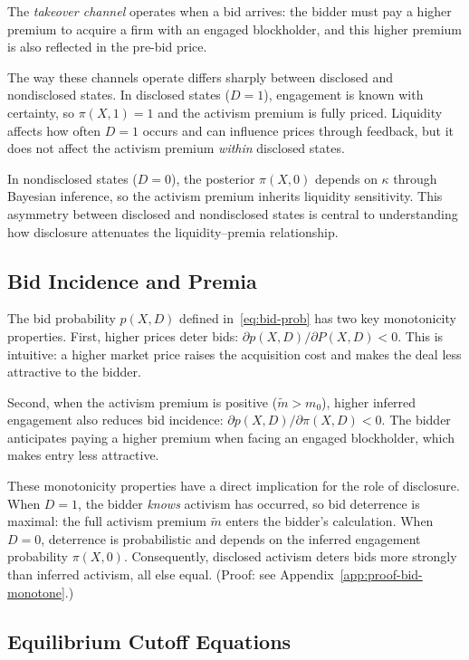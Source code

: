 \documentclass[11pt]{article}
\newcommand{\1}{\mathbf{1}}
\begin{document}
The \emph{takeover channel} operates when a bid arrives: the bidder must pay a higher premium to acquire a firm with an engaged blockholder, and this higher premium is also reflected in the pre-bid price.

The way these channels operate differs sharply between disclosed and nondisclosed states. In disclosed states ($D=1$), engagement is known with certainty, so $\pi(X,1)=1$ and the activism premium is fully priced. Liquidity affects how often $D=1$ occurs and can influence prices through feedback, but it does not affect the activism premium \emph{within} disclosed states.

In nondisclosed states ($D=0$), the posterior $\pi(X,0)$ depends on $\kappa$ through Bayesian inference, so the activism premium inherits liquidity sensitivity. This asymmetry between disclosed and nondisclosed states is central to understanding how disclosure attenuates the liquidity--premia relationship.

%
\subsection{Bid Incidence and Premia}
%

The bid probability $p(X,D)$ defined in~\eqref{eq:bid-prob} has two key monotonicity properties. First, higher prices deter bids: $\partial p(X,D)/\partial P(X,D)<0$. This is intuitive: a higher market price raises the acquisition cost and makes the deal less attractive to the bidder.

Second, when the activism premium is positive ($\tilde{m}>m_0$), higher inferred engagement also reduces bid incidence: $\partial p(X,D)/\partial\pi(X,D)<0$. The bidder anticipates paying a higher premium when facing an engaged blockholder, which makes entry less attractive.

These monotonicity properties have a direct implication for the role of disclosure. When $D=1$, the bidder \emph{knows} activism has occurred, so bid deterrence is maximal: the full activism premium $\tilde{m}$ enters the bidder's calculation. When $D=0$, deterrence is probabilistic and depends on the inferred engagement probability $\pi(X,0)$. Consequently, disclosed activism deters bids more strongly than inferred activism, all else equal. (Proof: see Appendix~\ref{app:proof-bid-monotone}.)

%
\subsection{Equilibrium Cutoff Equations}
%
\end{document}
